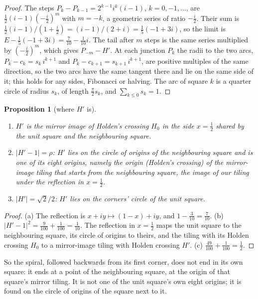 \documentclass[11pt,a4paper]{article}
\theoremstyle{plain}
\newtheorem{proposition}[theorem]{Proposition}
\theoremstyle{definition}
\theoremstyle{remark}
\begin{document}
\begin{proof}
The steps $P_k-P_{k-1}=2^{k-1}i^k(i-1)$, $k=0,-1,\dots$, are $\tfrac12(i-1)(-\tfrac{i}{2})^{m}$ with $m=-k$, a geometric series of ratio $-\tfrac i2$. Their sum is $\tfrac12(i-1)/(1+\tfrac i2)=(i-1)/(2+i)=\tfrac15(-1+3i)$, so the limit is $E-\tfrac15(-1+3i)=\tfrac7{10}-\tfrac1{10}i$. The tail after $m$ steps is the same series multiplied by $(-\tfrac i2)^m$, which gives $P_{-m}-H'$. At each junction $P_k$ the radii to the two arcs, $P_k-c_k=s_k\,i^{k+1}$ and $P_k-c_{k+1}=s_{k+1}\,i^{k+1}$, are positive multiples of the same direction, so the two arcs have the same tangent there and lie on the same side of it; this holds for any sides, Fibonacci or halving. The arc of square $k$ is a quarter circle of radius $s_k$, of length $\tfrac\pi2 s_k$, and $\sum_{k\le0}s_k=1$.
\end{proof}

\begin{proposition}[where $H'$ is]\label{prop:where}
\begin{enumerate}[label=(\alph*),itemsep=1pt]
\item $H'$ is the mirror image of Holden's crossing $H_0$ in the side $x=\tfrac12$ shared by the unit square and the neighbouring square.
\item $|H'-1|=\rho$: $H'$ lies on the circle of origins of the neighbouring square and is one of its eight origins, namely the origin (Holden's crossing) of the mirror-image tiling that starts from the neighbouring square, the image of our tiling under the reflection in $x=\tfrac12$.
\item $|H'|=\sqrt2/2$: $H'$ lies on the corners' circle of the unit square.
\end{enumerate}
\end{proposition}

\begin{proof}
(a) The reflection is $x+iy\mapsto(1-x)+iy$, and $1-\tfrac3{10}=\tfrac7{10}$. (b) $|H'-1|^2=\tfrac9{100}+\tfrac1{100}=\tfrac1{10}$. The reflection in $x=\tfrac12$ maps the unit square to the neighbouring square, its circle of origins to theirs, and the tiling with its Holden crossing $H_0$ to a mirror-image tiling with Holden crossing $H'$. (c) $\tfrac{49}{100}+\tfrac1{100}=\tfrac12$.
\end{proof}

So the spiral, followed backwards from its first corner, does not end in its own square: it ends at a point of the neighbouring square, at the origin of that square's mirror tiling. It is not one of the unit square's own eight origins; it is found on the circle of origins of the square next to it.
\end{document}

